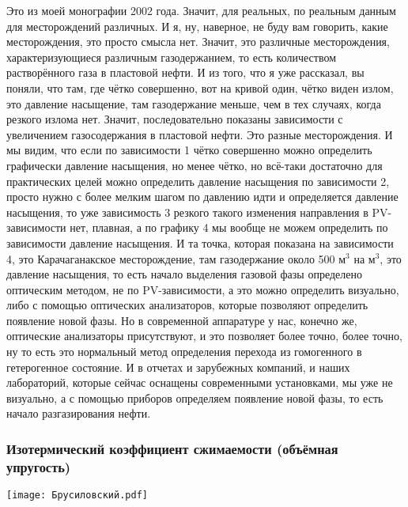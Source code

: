 \documentclass[main.tex]{subfiles}
\begin{document}
Это из моей монографии 2002 года.
Значит, для реальных, по реальным данным для месторождений различных.
И я, ну, наверное, не буду вам говорить, какие месторождения, это просто смысла нет.
Значит, это различные месторождения, характеризующиеся различным газодержанием, то есть количеством растворённого газа в пластовой нефти.
И из того, что я уже рассказал, вы поняли, что там, где чётко совершенно, вот на кривой один, чётко виден излом, это давление насыщение, там газодержание меньше, чем в тех случаях, когда резкого излома нет.
Значит, последовательно показаны зависимости с увеличением газосодержания в пластовой нефти.
Это разные месторождения.
И мы видим, что если по зависимости 1 чётко совершенно можно определить графически давление насыщения, но менее чётко, но всё-таки достаточно для практических целей можно определить давление насыщения по зависимости 2, просто нужно с более мелким шагом по давлению идти и определяется давление насыщения, то уже зависимость 3 резкого такого изменения направления в PV-зависимости нет, плавная, а по графику 4 мы вообще не можем определить по зависимости давление насыщения.
И та точка, которая показана на зависимости 4, это Карачаганакское месторождение, там газодержание около 500 м$^3$ на м$^3$, это давление насыщения, то есть начало выделения газовой фазы определено оптическим методом, не по PV-зависимости, а это можно определить визуально, либо с помощью оптических анализаторов, которые позволяют определить появление новой фазы.
Но в современной аппаратуре у нас, конечно же, оптические анализаторы присутствуют, и это позволяет более точно, более точно, ну то есть это нормальный метод определения перехода из гомогенного в гетерогенное состояние.
И в отчетах и зарубежных компаний, и наших лабораторий, которые сейчас оснащены современными установками, мы уже не визуально, а с помощью приборов определяем появление новой фазы, то есть начало разгазирования нефти.

\subsubsection{Изотермический коэффициент сжимаемости (объёмная упругость)}

\begin{center}
\texttt{[image: Брусиловский.pdf]}
\end{center}
\end{document}
